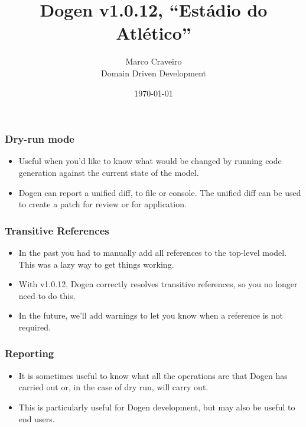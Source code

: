 \documentclass{beamer}
\title{Dogen v1.0.12, \enquote{Estádio do Atlético}}
\author{Marco Craveiro \\
  Domain Driven Development
}
\date{\today}
\begin{document}
\begin{frame}
\titlepage
\end{frame}

\begin{frame}
\frametitle{Dry-run mode}

\begin{itemize}

\item Useful when you'd like to know what would be changed by running
  code generation against the current state of the model.

  \pause

\item Dogen can report a unified diff, to file or console. The unified
  diff can be used to create a patch for review or for application.

\end{itemize}

\end{frame}

\begin{frame}
\frametitle{Transitive References}

\begin{itemize}

\item In the past you had to manually add all references to the
  top-level model. This was a lazy way to get things working.

  \pause

\item With v1.0.12, Dogen correctly resolves transitive references, so
  you no longer need to do this.

  \pause

\item In the future, we'll add warnings to let you know when a
  reference is not required.

\end{itemize}

\end{frame}

\begin{frame}
\frametitle{Reporting}

\begin{itemize}

\item It is sometimes useful to know what all the operations are that
  Dogen has carried out or, in the case of dry run, will carry out.

  \pause

\item This is particularly useful for Dogen development, but may also
  be useful to end users.

\end{itemize}

\end{frame}
\end{document}
